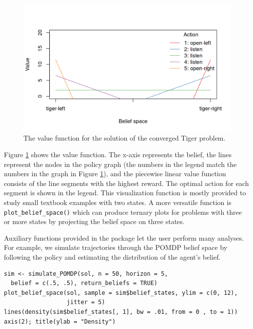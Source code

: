 \begin{figure}
\includegraphics[width=1\linewidth]{pomdp_files/figure-latex/tiger-value-function-1} \caption{The value function for the solution of the converged Tiger problem.}\label{fig:tiger-value-function}
\end{figure}

Figure \ref{fig:tiger-value-function} shows the value function.
The x-axis represents the belief, the lines represent the nodes in the policy graph (the numbers in the legend match the numbers in the graph in Figure \ref{fig:tiger-value-function}),
and the piecewise linear value function consists of the line segments with the highest reward.
The optimal action for each segment is shown in the legend.
This visualization function is mostly provided to study small textbook examples
with two states. A more versatile function is \texttt{plot\_belief\_space()} which can produce
ternary plots for problems with three or more states by projecting the belief
space on three states.

Auxiliary functions provided in the package let the user perform many analyses. For example, we simulate
trajectories through the POMDP belief space by following the policy and estimating the distribution of the
agent's belief.

\begin{verbatim}
sim <- simulate_POMDP(sol, n = 50, horizon = 5, 
  belief = c(.5, .5), return_beliefs = TRUE)
plot_belief_space(sol, sample = sim$belief_states, ylim = c(0, 12), 
                  jitter = 5)
lines(density(sim$belief_states[, 1], bw = .01, from = 0 , to = 1)) 
axis(2); title(ylab = "Density")
\end{verbatim}

